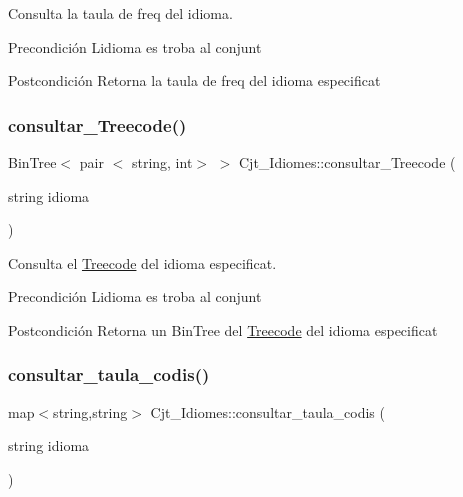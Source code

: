 Consulta la taula de freq del idioma. 

\begin{DoxyPrecond}{Precondición}
L\textquotesingle{}idioma es troba al conjunt 
\end{DoxyPrecond}
\begin{DoxyPostcond}{Postcondición}
Retorna la taula de freq del idioma especificat 
\end{DoxyPostcond}
\mbox{\label{class_cjt___idiomes_a2bf21a96cdbba804d53a097c42fe3b93}} 
\subsubsection{\texorpdfstring{consultar\+\_\+\+Treecode()}{consultar\_Treecode()}}
{\footnotesize\ttfamily Bin\+Tree$<$ pair $<$ string, int$>$ $>$ Cjt\+\_\+\+Idiomes\+::consultar\+\_\+\+Treecode (\begin{DoxyParamCaption}\item[{string}]{idioma }\end{DoxyParamCaption})}



Consulta el \hyperlink{class_treecode}{Treecode} del idioma especificat. 

\begin{DoxyPrecond}{Precondición}
L\textquotesingle{}idioma es troba al conjunt 
\end{DoxyPrecond}
\begin{DoxyPostcond}{Postcondición}
Retorna un Bin\+Tree del \hyperlink{class_treecode}{Treecode} del idioma especificat 
\end{DoxyPostcond}
\mbox{\label{class_cjt___idiomes_af8497129cf6b3b094e6f26a0c030c785}} 
\subsubsection{\texorpdfstring{consultar\+\_\+taula\+\_\+codis()}{consultar\_taula\_codis()}}
{\footnotesize\ttfamily map$<$string,string$>$ Cjt\+\_\+\+Idiomes\+::consultar\+\_\+taula\+\_\+codis (\begin{DoxyParamCaption}\item[{string}]{idioma }\end{DoxyParamCaption})}



